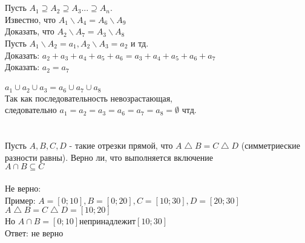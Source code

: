 \documentclass{article}
\begin{document}
\section{}
Пусть $A_1 \supseteq A_2 \supseteq A_3... \supseteq A_n$.\\ 
Известно, что $A_1 \backslash A_4 = A_6 \backslash A_9$
\\Доказать, что $A_2\backslash A_7 = A_3 \backslash A_8$\\
Пусть $A_1\backslash A_2=a_1, A_2\backslash A_3=a_2$ и тд.\\
Доказать: $a_2+a_3+a_4+a_5+a_6=a_3+a_4+a_5+a_6+a_7$\\
Доказать: $a_2=a_7$
\\
\\
$a_1\cup a_2\cup a_3=a_6\cup a_7\cup a_8$\\
Так как последовательность невозрастающая,\\ следовательно $a_1=a_2=a_3=a_6=a_7=a_8=\emptyset$ чтд.\\
\section{}
Пусть $A,B,C,D$ - такие отрезки прямой, что $A \bigtriangleup B = C \bigtriangleup D$ (симметриеские разности равны). Верно ли, что выполняется включение\\
$A\cap B\subseteq C$
\\
\\
Не верно:
\\Пример: $A=[0;10], B=[0;20], C=[10;30], D=[20;30]$
\\$A \bigtriangleup B = C \bigtriangleup D = [10;20]$
\\Но $A\cap B = [0;10] не принадлежит [10;30]$
\\Ответ: не верно
\end{document}
